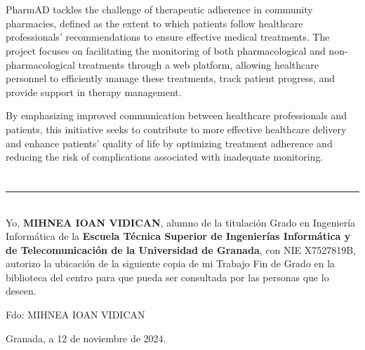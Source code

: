  \\

\vspace{0.7cm}
\\

PharmAD tackles the challenge of therapeutic adherence in community pharmacies, defined as the extent to which patients follow healthcare professionals' recommendations to ensure effective medical treatments. The project focuses on facilitating the monitoring of both pharmacological and non-pharmacological treatments through a web platform, allowing healthcare personnel to efficiently manage these treatments, track patient progress, and provide support in therapy management. \

By emphasizing improved communication between healthcare professionals and patients, this initiative seeks to contribute to more effective healthcare delivery and enhance patients' quality of life by optimizing treatment adherence and reducing the risk of complications associated with inadequate monitoring.

\chapter*{}
\thispagestyle{empty}

\noindent\rule[-1ex]{\textwidth}{2pt}\\[4.5ex]

Yo, \textbf{MIHNEA IOAN VIDICAN}, alumno de la titulación Grado en Ingeniería Informática de la \textbf{Escuela Técnica Superior
	de Ingenierías Informática y de Telecomunicación de la Universidad de Granada}, con NIE X7527819B, autorizo la
ubicación de la siguiente copia de mi Trabajo Fin de Grado en la biblioteca del centro para que pueda ser
consultada por las personas que lo deseen.

\vspace{6cm}

\noindent Fdo: MIHNEA IOAN VIDICAN

\vspace{2cm}

\begin{flushright}
	Granada, a 12 de noviembre de 2024.
\end{flushright}

\chapter*{}
\thispagestyle{empty}


